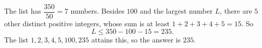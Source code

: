 The list has $\dfrac{350}{50}=7$ numbers. Besides $100$ and the largest number $L$, there are $5$ other distinct positive integers, whose sum is at least $1+2+3+4+5=15$. So
\[
L\le350-100-15=235 .
\]
The list $1,2,3,4,5,100,235$ attains this, so the answer is $\boxed{235}$.
